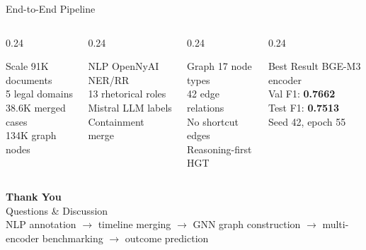 \documentclass[aspectratio=169, 9pt]{beamer}
\begin{document}
\begin{frame}{End-to-End Pipeline}
  \vspace{8pt}
  \begin{columns}
    \begin{column}{0.24\textwidth}
      \begin{block}{\centering\small Scale}
        \centering\scriptsize
        91K documents\\
        5 legal domains\\
        38.6K merged cases\\
        134K graph nodes
      \end{block}
    \end{column}
    \begin{column}{0.24\textwidth}
      \begin{block}{\centering\small NLP}
        \centering\scriptsize
        OpenNyAI NER/RR\\
        13 rhetorical roles\\
        Mistral LLM labels\\
        Containment merge
      \end{block}
    \end{column}
    \begin{column}{0.24\textwidth}
      \begin{block}{\centering\small Graph}
        \centering\scriptsize
        17 node types\\
        42 edge relations\\
        No shortcut edges\\
        Reasoning-first HGT
      \end{block}
    \end{column}
    \begin{column}{0.24\textwidth}
      \begin{block}{\centering\small Best Result}
        \centering\scriptsize
        BGE-M3 encoder\\
        Val F1: \textbf{0.7662}\\
        Test F1: \textbf{0.7513}\\
        Seed 42, epoch 55
      \end{block}
    \end{column}
  \end{columns}
\end{frame}

\begin{frame}[plain]
  \begin{center}
    \vspace{2cm}
    {\Large\bfseries\color{primary} Thank You}\\[16pt]
    {\large Questions \& Discussion}\\[24pt]
    \textcolor{muted}{\small
      NLP annotation $\to$ timeline merging $\to$ GNN graph construction $\to$ multi-encoder benchmarking $\to$ outcome prediction
    }
  \end{center}
\end{frame}
\end{document}
